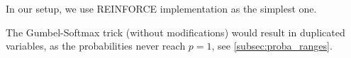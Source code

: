 \documentclass[a4paper,11pt,oneside]{report}
\begin{document}
\begin{enumerate}


\end{enumerate}

In our setup, we use REINFORCE implementation as the simplest one.%

The Gumbel-Softmax trick (without modifications) would result in duplicated variables, as the probabilities never reach $p=1$, see \autoref{subsec:proba_ranges}.


\end{document}
